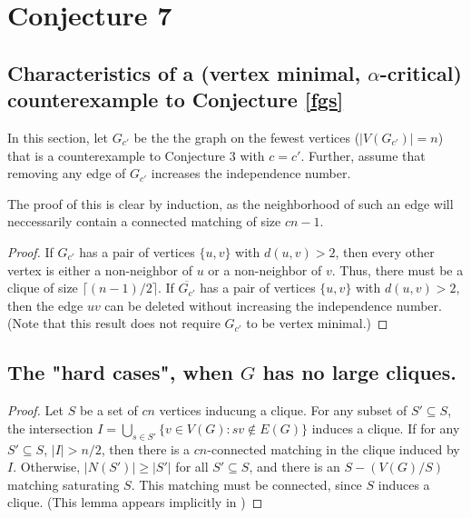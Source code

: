 %
%

\section{Conjecture 7}
\subsection{Characteristics of a (vertex minimal, $\alpha$-critical) counterexample to Conjecture \ref{fgs}}

In this section, let $G_{c'}$ be the the graph on the fewest vertices ($|V(G_{c'})| = n$) that is a counterexample to Conjecture 3 with $c = c'$.  Further, assume that removing any edge of $G_{c'}$ increases the independence number.


The proof of this is clear by induction, as the neighborhood of such an edge will neccessarily contain a connected matching of size $cn-1$.


\begin{proof}If $G_{c'}$ has a pair of vertices $\{u,v\}$ with $d(u,v) > 2$, then every other vertex is either a non-neighbor of $u$ or a non-neighbor of $v$.  Thus, there must be a clique of size $\lceil (n-1)/2 \rceil$.  If $\overline{G_{c'}}$ has a pair of vertices $\{u,v\}$ with $d(u,v) > 2$, then the edge $uv$ can be deleted without increasing the independence number.  (Note that this result does not require $G_{c'}$ to be vertex minimal.)
\end{proof}

\subsection{The "hard cases", when $G$ has no large cliques.} 

\begin{proof}
	Let $S$ be a set of $cn$ vertices inducung a clique.  For any subset of $S'\subseteq S$, the intersection $\displaystyle I = \bigcup_{s\in S'} \{v \in V(G): sv \notin E(G)\}$ induces a clique.  If for any $S'\subseteq S$, $|I| > n/2$, then there is a $cn$-connected matching in the clique induced by $I$.  Otherwise, $|N(S')| \geq |S'|$ for all $S'\subseteq S$, and there is an $S-(V(G)/S)$ matching saturating $S$.  This matching must be connected, since $S$ induces a clique. (This lemma appears implicitly in \cite{FGS})
\end{proof}


